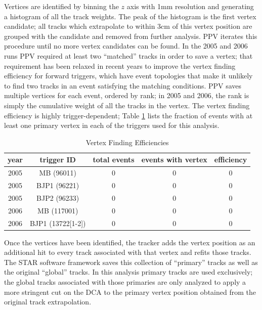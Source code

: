 Vertices are identified by binning the $z$ axis with 1mm resolution and
generating a histogram of all the track weights. The peak of the histogram is
the first vertex candidate; all tracks which extrapolate to within 3cm of this
vertex position are grouped with the candidate and removed from further
analysis. PPV iterates this procedure until no more vertex candidates can be
found. In the 2005 and 2006 runs PPV required at least two ``matched'' tracks
in order to save a vertex; that requirement has been relaxed in recent years
to improve the vertex finding efficiency for forward triggers, which have
event topologies that make it unlikely to find two tracks in an event
satisfying the matching conditions. PPV saves multiple vertices for each
event, ordered by rank; in 2005 and 2006, the rank is simply the cumulative
weight of all the tracks in the vertex. The vertex finding efficiency is
highly trigger-dependent; Table \ref{tbl:vertex-finding-efficiencies} lists
the fraction of events with at least one primary vertex in each of the
triggers used for this analysis.

\begin{table}
  \begin{center}
    \begin{tabular}{cc|ccc}
      \hline
      year & trigger ID & total events & events with vertex & efficiency\\
      \hline
      \hline
      2005 & MB (96011) & 0 & 0 & 0\\
      \hline
      2005 & BJP1 (96221) & 0 & 0 & 0\\
      \hline
      2005 & BJP2 (96233) & 0 & 0 & 0\\
      \hline
      2006 & MB (117001) & 0 & 0 & 0\\
      \hline
      2006 & BJP1 (13722[1-2]) & 0 & 0 & 0\\
      \hline
    \end{tabular}
  \end{center}
  \caption{Vertex Finding Efficiencies}
  \label{tbl:vertex-finding-efficiencies}
\end{table}

Once the vertices have been identified, the tracker adds the vertex position
as an additional hit to every track associated with that vertex and refits
those tracks. The STAR software framework saves this collection of ``primary''
tracks as well as the original ``global'' tracks. In this analysis primary
tracks are used exclusively; the global tracks associated with those primaries
are only analyzed to apply a more stringent cut on the DCA to the primary
vertex position obtained from the original track extrapolation.

